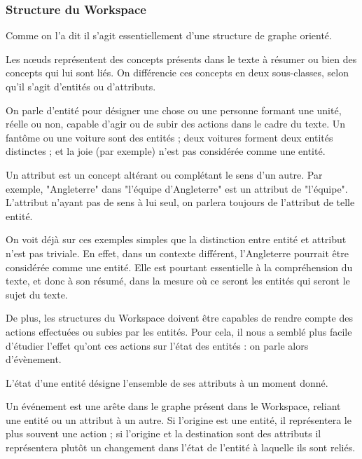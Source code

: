 \documentclass[a4paper, 12pt]{article}
\begin{document}
\subsubsection{Structure du Workspace}
Comme on l'a dit il s'agit essentiellement d'une structure de graphe orienté.

Les nœuds représentent des concepts présents dans le texte à résumer ou bien des concepts qui lui sont liés. On différencie ces concepts en deux sous-classes, selon qu'il s'agit d'entités ou d'attributs.

\begin{definition}[Entité]
On parle d'entité pour désigner une chose ou une personne formant une unité, réelle ou non, capable d'agir ou de subir des actions dans le cadre du texte. Un fantôme ou une voiture sont des entités ; deux voitures forment deux entités distinctes ; et la joie (par exemple) n'est pas considérée comme une entité.
\end{definition}
\begin{definition}[Attribut]
Un attribut est un concept altérant ou complétant le sens d'un autre. Par exemple, "Angleterre" dans "l'équipe d'Angleterre" est un attribut de "l'équipe". L'attribut n'ayant pas de sens à lui seul, on parlera toujours de l'attribut de telle entité.
\end{definition}

On voit déjà sur ces exemples simples que la distinction entre entité et attribut n'est pas triviale. En effet, dans un contexte différent, l'Angleterre pourrait être considérée comme une entité. Elle est pourtant essentielle à la compréhension du texte, et donc à son résumé, dans la mesure où ce seront les entités qui seront le sujet du texte.

De plus, les structures du Workspace doivent être capables de rendre compte des actions effectuées ou subies par les entités. Pour cela, il nous a semblé plus facile d'étudier l'effet qu'ont ces actions sur l'état des entités : on parle alors d'évènement.

\begin{definition}[État]
L'état d'une entité désigne l'ensemble de ses attributs à un moment donné.
\end{definition}
\begin{definition}[Évènement]
Un événement est une arête dans le graphe présent dans le Workspace, reliant une entité ou un attribut à un autre. Si l'origine est une entité, il représentera le plus souvent une action ; si l'origine et la destination sont des attributs il représentera plutôt un changement dans l'état de l'entité à laquelle ils sont reliés.
\end{definition}
\end{document}
